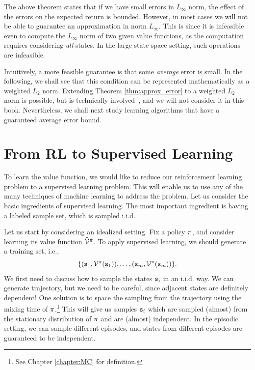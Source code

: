 The above theorem states that if we have small errors in
$L_\infty$ norm, the effect of the errors on the expected return is
bounded. However, in most cases we will not be able to guarantee an
approximation in norm $L_\infty$. This is since it is infeasible even
to compute the $L_\infty$ norm of two given value functions, as the computation requires considering {\em all} states. In the large state space setting, such operations are infeasible. 

Intuitively, a more feasible guarantee is that some \textit{average} error is small. In the following, we shall see that this condition can be represented mathematically as a weighted $L_2$ norm. Extending Theorem \ref{thm:approx_error} to a weighted $L_2$ norm is possible, but is technically involved~\cite{munos2007performance}, and we will not consider it in this book. Nevertheless, we shall next study learning algorithms that have a guaranteed average error bound.

\section{From RL to Supervised Learning}

To learn the value function, we would like to reduce our reinforcement learning problem to a
supervised learning problem. This will enable us to use any of the many techniques of machine learning to address the problem. Let us consider the basic ingredients of supervised learning. The most important ingredient is having a labeled sample set, which is sampled i.i.d.

Let us start by considering an idealized setting. Fix a policy $\pi$, and consider learning its value function $\widehat{\mathcal{V}}^{\pi}$. To apply supervised learning, we should
generate a training set, i.e., 
\[
\{({\tt s}_1, \mathcal{V}^\pi({\tt s}_1)),\ldots,
({\tt s}_m,\mathcal{V}^\pi({\tt s}_m))\}.
\]
We first need to discuss how to sample the states ${\tt s}_i$ in an
i.i.d. way. We can generate trajectory, but we need to be careful,
since adjacent states are definitely dependent! One solution is to
space the sampling from the trajectory using the mixing time of
$\pi$.\footnote{See Chapter \ref{chapter:MC} for definition.}
This will give us samples ${\tt s}_i$ which are sampled (almost) from the
stationary distribution of $\pi$ and are (almost) independent. In the episodic setting, we can sample different episodes, and states from different episodes are guaranteed to be independent.

